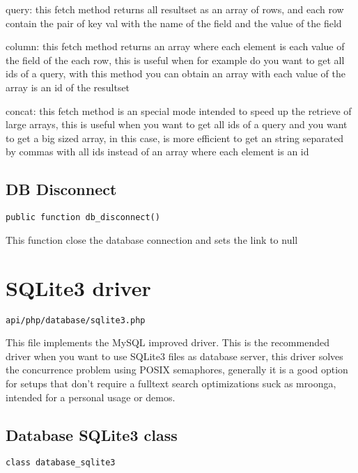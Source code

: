 \documentclass[a4paper]{book}
\begin{document}
query: this fetch method returns all resultset as an array of rows, and each row contain the
pair of key val with the name of the field and the value of the field

column: this fetch method returns an array where each element is each value of the field of
the each row, this is useful when for example do you want to get all ids of a query, with
this method you can obtain an array with each value of the array is an id of the resultset

concat: this fetch method is an special mode intended to speed up the retrieve of large
arrays, this is useful when you want to get all ids of a query and you want to get a big
sized array, in this case, is more efficient to get an string separated by commas with all
ids instead of an array where each element is an id

\hypertarget{toc383}{}
\subsection{DB Disconnect}

\begin{lstlisting}
public function db_disconnect()
\end{lstlisting}

This function close the database connection and sets the link to null

\hypertarget{toc384}{}
\section{SQLite3 driver}

\begin{lstlisting}
api/php/database/sqlite3.php
\end{lstlisting}

This file implements the MySQL improved driver. This is the recommended driver when you want
to use SQLite3 files as database server, this driver solves the concurrence problem using
POSIX semaphores, generally it is a good option for setups that don't require a fulltext
search optimizations suck as mroonga, intended for a personal usage or demos.

\hypertarget{toc385}{}
\subsection{Database SQLite3 class}

\begin{lstlisting}
class database_sqlite3
\end{lstlisting}
\end{document}
